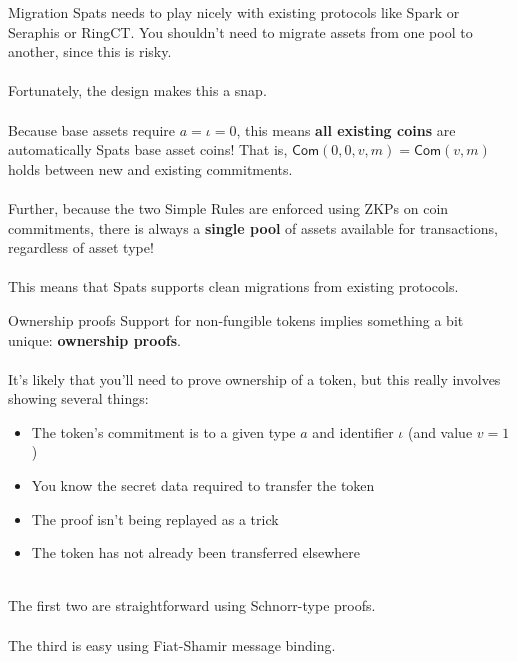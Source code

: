 \documentclass[aspectratio=169]{beamer}
\newcommand{\com}{\mathsf{Com}}
\begin{document}
\begin{frame}{Migration}
	Spats needs to play nicely with existing protocols like Spark or Seraphis or RingCT.
	You shouldn't need to migrate assets from one pool to another, since this is risky. \\~\\

	Fortunately, the design makes this a snap. \\~\\

	Because base assets require $a = \iota = 0$, this means \textbf{all existing coins} are automatically Spats base asset coins!
	That is, $\com(0, 0, v, m) = \com(v, m)$ holds between new and existing commitments. \\~\\

	Further, because the two Simple Rules are enforced using ZKPs on coin commitments, there is always a \textbf{single pool} of assets available for transactions, regardless of asset type! \\~\\

	This means that Spats supports clean migrations from existing protocols.
\end{frame}

\begin{frame}{Ownership proofs}
	Support for non-fungible tokens implies something a bit unique: \textbf{ownership proofs}. \\~\\

	It's likely that you'll need to prove ownership of a token, but this really involves showing several things:
	\begin{itemize}
		\item The token's commitment is to a given type $a$ and identifier $\iota$ (and value $v = 1$)
		\item You know the secret data required to transfer the token
		\item The proof isn't being replayed as a trick
		\item The token has not already been transferred elsewhere \\~\\
	\end{itemize}

	The first two are straightforward using Schnorr-type proofs. \\~\\

	The third is easy using Fiat-Shamir message binding.
\end{frame}
\end{document}
